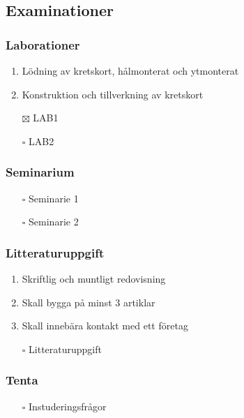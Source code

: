 \documentclass[11pt]{article}
\begin{document}
\subsection{Examinationer}
\label{sec:orgff71fe0}
\subsubsection{Laborationer}
\label{sec:orgfd22081}
\begin{enumerate}
\item Lödning av kretskort, hålmonterat och ytmonterat
\item Konstruktion och tillverkning av kretskort
\end{enumerate}


\begin{itemize}
\item[{$\boxtimes$}] LAB1
\item[{$\square$}] LAB2
\end{itemize}

\subsubsection{Seminarium}
\label{sec:orgd789493}
\begin{itemize}
\item[{$\square$}] Seminarie 1
\item[{$\square$}] Seminarie 2
\end{itemize}

\subsubsection{Litteraturuppgift}
\label{sec:org2ffc1c4}
\begin{enumerate}
\item Skriftlig och muntligt redovisning
\item Skall bygga på minst 3 artiklar
\item Skall innebära kontakt med ett företag
\end{enumerate}


\begin{itemize}
\item[{$\square$}] Litteraturuppgift
\end{itemize}


\subsubsection{Tenta}
\label{sec:org315ee49}
\begin{itemize}
\item[{$\square$}] Instuderingsfrågor
\end{itemize}
\end{document}
